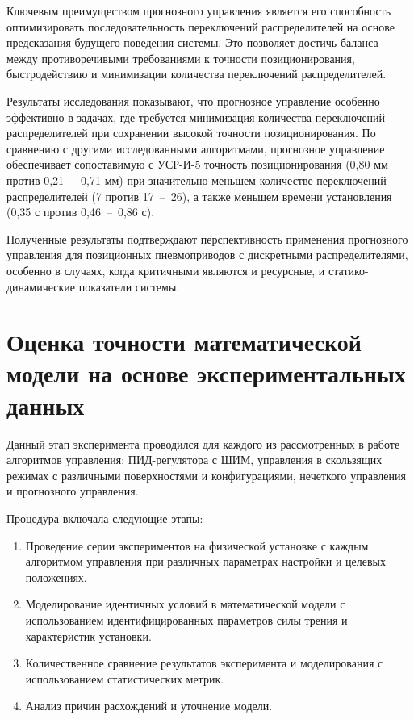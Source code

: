 Ключевым преимуществом прогнозного управления является его способность оптимизировать последовательность переключений
распределителей на основе предсказания будущего поведения системы. Это позволяет достичь баланса между противоречивыми требованиями
к точности позиционирования, быстродействию и минимизации количества переключений распределителей.

Результаты исследования показывают, что прогнозное управление особенно эффективно в задачах, где требуется минимизация
количества переключений распределителей при сохранении высокой точности позиционирования.  По сравнению с другими исследованными алгоритмами, прогнозное управление
обеспечивает сопоставимую с УСР-И-5 точность позиционирования (0,80 мм против 0,21~--~0,71 мм) при значительно меньшем количестве
переключений распределителей (7 против 17~--~26), а также меньшем времени установления (0,35 с против 0,46~--~0,86 с).

Полученные результаты подтверждают перспективность применения прогнозного управления для позиционных пневмоприводов с дискретными распределителями,
особенно в случаях, когда критичными являются и ресурсные, и статико-динамические показатели системы.


\section{Оценка точности математической модели на основе экспериментальных данных}

Данный этап эксперимента проводился для каждого из рассмотренных в работе алгоритмов управления: ПИД-регулятора с ШИМ,
управления в скользящих режимах с различными поверхностями и конфигурациями, нечеткого управления и прогнозного управления.

Процедура включала следующие этапы:
\begin{enumerate}
	\item Проведение серии экспериментов на физической установке с каждым алгоритмом управления при различных параметрах настройки и целевых положениях.
	\item Моделирование идентичных условий в математической модели с использованием идентифицированных параметров силы трения и характеристик установки.
	\item Количественное сравнение результатов эксперимента и моделирования с использованием статистических метрик.
	\item Анализ причин расхождений и уточнение модели.
\end{enumerate}


